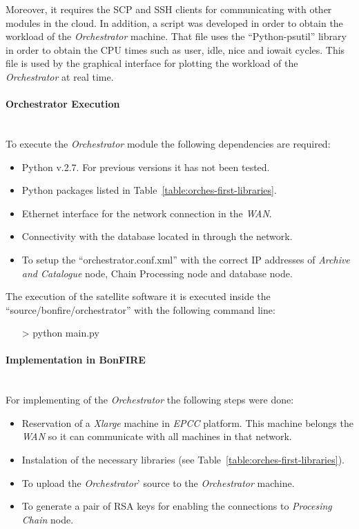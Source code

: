 Moreover, it requires the \ac{SCP} and \ac{SSH} clients for communicating  with other
modules in the cloud.
In addition, a script was developed in order to obtain the workload of the
\emph{Orchestrator} machine. That file uses the ``Python-psutil'' library in order to
obtain the CPU times such as user, idle, nice and iowait cycles. This file is
used by the graphical interface for plotting the workload of the \emph{Orchestrator} at
real time.


\paragraph{Orchestrator Execution}~\\

To execute the \emph{Orchestrator} module the following dependencies are required:
\begin{itemize}
\item Python v.2.7. For previous versions it has not been tested.
\item Python packages listed in Table~\ref{table:orches-first-libraries}.
\item Ethernet interface for the network connection in the \bonfire \emph{WAN}.
\item Connectivity with the database located in \bonfire through the network.
\item To setup the ``orchestrator.conf.xml'' with the correct \ac{IP} addresses
  of \emph{Archive and Catalogue} node, Chain Processing node and database node.
\end{itemize}

The execution of the satellite software it is executed inside the
``source/bonfire/orchestrator'' with the following
command line:
\begin{itemize}
\item[>] python main.py
\end{itemize}
 
\paragraph{Implementation in BonFIRE}~\\

For implementing of the \emph{Orchestrator} the following steps were done:

\begin{itemize}
 \item Reservation of a \emph{Xlarge} machine in \emph{EPCC} \bonfire
   platform. This machine belongs the \bonfire \emph{WAN} so it can communicate
   with all machines in that network. 
 \item Instalation of the necessary libraries (see
   Table~\ref{table:orches-first-libraries}).
 \item To upload the \emph{Orchestrator}' source to the \emph{Orchestrator} machine.
 \item To generate a pair of \ac{RSA} keys for enabling the connections to
   \emph{Procesing Chain} node.
\end{itemize}

